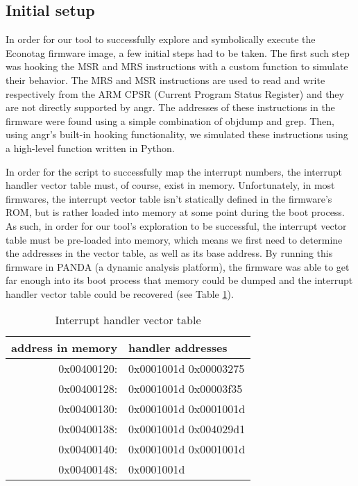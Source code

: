 \documentclass[letterpaper, 11 pt, conference]{ieeeconf}
\begin{document}
\subsection{Initial setup} \label{setup}
In order for our tool to successfully explore and symbolically execute the Econotag firmware image, a few initial steps had to be taken. The first such step was hooking the MSR and MRS instructions with a custom function to simulate their behavior. The MRS and MSR instructions are used to read and write respectively from the ARM CPSR (Current Program Status Register) and they are not directly supported by angr. The addresses of these instructions in the firmware were found using a simple combination of objdump and grep. Then, using angr’s built-in hooking functionality, we simulated these instructions using a high-level function written in Python.

In order for the script to successfully map the interrupt numbers, the interrupt handler vector table must, of course, exist in memory. Unfortunately, in most firmwares, the interrupt vector table isn’t statically defined in the firmware’s ROM, but is rather loaded into memory at some point during the boot process. As such, in order for our tool’s exploration to be successful, the interrupt vector table must be pre-loaded into memory, which means we first need to determine the addresses in the vector table, as well as its base address. By running this firmware in PANDA \cite{panda} (a dynamic analysis platform), the firmware was able to get far enough into its boot process that memory could be dumped and the interrupt handler vector table could be recovered (see Table \ref{table:vector}).

\begin{table}[h]
\centering
\begin{tabular}{r|p{4cm}}
address in memory & handler addresses \\ \hline
0x00400120: & 0x0001001d 0x00003275 \\ 
0x00400128: & 0x0001001d 0x00003f35 \\
0x00400130: & 0x0001001d 0x0001001d \\
0x00400138: & 0x0001001d 0x004029d1 \\
0x00400140: & 0x0001001d 0x0001001d \\
0x00400148: & 0x0001001d\\
\end{tabular}
\caption{Interrupt handler vector table}
\label{table:vector}
\end{table}
\end{document}

